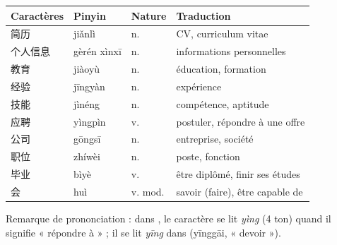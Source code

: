 \documentclass[11pt]{article}
\newcommand{\zh}[1]{\ifmmode\text{#1}\else{#1}\fi}
\begin{document}
\begin{definition}
\begin{center}
\begin{tabularx}{\linewidth}{|X|X|X|X|}
\hline
\rowcolor{popblueL} Caractères & Pinyin & Nature & Traduction \\
\hline
简历 & jiǎnlì & n. & CV, curriculum vitae \\
\hline
个人信息 & gèrén xìnxī & n. & informations personnelles \\
\hline
教育 & jiàoyù & n. & éducation, formation \\
\hline
经验 & jīngyàn & n. & expérience \\
\hline
技能 & jìnéng & n. & compétence, aptitude \\
\hline
应聘 & yìngpìn & v. & postuler, répondre à une offre \\
\hline
公司 & gōngsī & n. & entreprise, société \\
\hline
职位 & zhíwèi & n. & poste, fonction \\
\hline
毕业 & bìyè & v. & être diplômé, finir ses études \\
\hline
会 & huì & v. mod. & savoir (faire), être capable de \\
\hline
\end{tabularx}
\end{center}
Remarque de prononciation : dans \zh{应聘}, le caractère \zh{应} se lit \emph{yìng} (4 ton) quand il signifie « répondre à » ; il se lit \emph{yīng} dans \zh{应该} (yīnggāi, « devoir »).
\end{definition}
\end{document}
